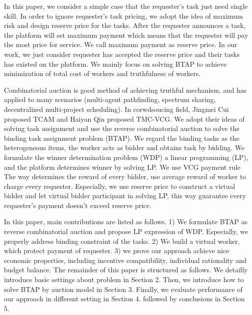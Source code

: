 In this paper, we consider a simple case that the requester's task just need single skill. In order to ignore requester's task pricing, we adopt the idea of maximum risk and design reserve price for the tasks. After the requester announces a task, the platform will set maximum payment which means that the requester will pay the most price for service. We call maximum payment as reserve price. In our work, we just consider requester has accepted the reserve price and their tasks has existed on the platform. We mainly focus on solving BTAP to achieve minimization of total cost of workers and truthfulness of workers.

Combinatorial auction is good method of achieving truthful mechanism, and has applied to many scenarios (multi-agent pathfinding\cite{DBLP:conf/aaai/AmirSS15}, spectrum sharing\cite{DBLP:conf/icc/ZhanCC15}, decentralized multi-project scheduling\cite{DBLP:conf/atal/SongKZX16}). In corwdsoucing field, Jingmei Cui proposed TCAM\cite{DBLP:conf/wcnc/CuiS0GDYL18} and Haiyan Qin proposed TMC-VCG\cite{DBLP:conf/IEEEcloud/QinZL17}. We adopt their ideas of solving task assignment and use the reverse combinatorial auction to solve the binding task assignment problem (BTAP). We regard the binding tasks as the heterogeneous items, the worker acts as bidder and obtains task by bidding. We formulate the winner determination problem (WDP) a linear programming (LP), and the platform determines winner by solving LP. We use VCG payment rule The way determines the reward of every bidder, use average reward of worker to charge every requester. Especially, we use reserve price to construct a virtual bidder and let virtual bidder participant in solving LP, this way guarantee every requester's payment doesn't exceed reserve price.

In this paper, main contributions are listed as follows. 1) We formulate BTAP as reverse combinatorial auction and propose LP expression of WDP. Especially, we properly address binding constraint of the tasks. 2) We build a virtual worker, which protect payment of requester. 3) we prove our approach achieve nice economic properties, including incentive compatibility, individual rationality and budget balance. The remainder of this paper is structured as follows. We  detailly introduce basic settings about problem in Section 2. Then, we introduce how to solve BTAP by auction model in Section 3. Finally, we evaluate performance of our approach in different setting in Section 4. followed by conclusions in Section 5.

